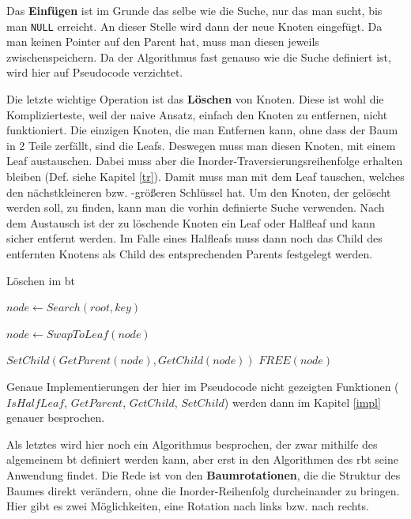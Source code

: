\documentclass[11pt]{article}
\newcommand{\lstin}[1]{\lstinline[language=C]{#1}}
\begin{document}
Das \textbf{Einfügen} ist im Grunde das selbe wie die Suche, nur das man sucht, bis man \lstin{NULL} erreicht. 
An dieser Stelle wird dann der neue Knoten eingefügt. Da man keinen Pointer auf den Parent hat, muss man diesen jeweils zwischenspeichern.
\cite[S. 205]{aic}
Da der Algorithmus fast genauso wie die Suche definiert ist, wird hier auf Pseudocode verzichtet. 

Die letzte wichtige Operation ist das \textbf{Löschen} von Knoten. Diese ist wohl die Komplizierteste, weil der naive Ansatz, einfach den Knoten zu entfernen, nicht funktioniert.
Die einzigen Knoten, die man Entfernen kann, ohne dass der Baum in 2 Teile zerfällt, sind die Leafs.
Deswegen muss man diesen Knoten, mit einem Leaf austauschen. Dabei muss aber die Inorder-Traversierungsreihenfolge erhalten bleiben (Def. siehe Kapitel \ref{tr}).
Damit muss man mit dem Leaf tauschen, welches den nächstkleineren bzw. -größeren Schlüssel hat.
Um den Knoten, der gelöscht werden soll, zu finden, kann man die vorhin definierte Suche verwenden.
Nach dem Austausch ist der zu löschende Knoten ein Leaf oder Halfleaf und kann sicher entfernt werden. 
Im Falle eines Halfleafs muss dann noch das Child des entfernten Knotens als Child des entsprechenden Parents festgelegt werden.

\begin{algorithm}
  \caption{Löschen im \gls{bt}}
  \begin{algorithmic}[1]
    \State $node \gets Search(root, key)$

      
      \Return
    \EndIf

    \State $node \gets SwapToLeaf(node)$

      \State $SetChild(GetParent(node), GetChild(node))$
    \EndIf
    \State $FREE(node)$  
    \EndProcedure
  \end{algorithmic}
\end{algorithm}
\cite[S. 210f]{aic}

Genaue Implementierungen der hier im Pseudocode nicht gezeigten Funktionen ($IsHalfLeaf$, $GetParent$, $GetChild$, $SetChild$) werden dann im Kapitel \ref{impl} genauer besprochen.

Als letztes wird hier noch ein Algorithmus besprochen, der zwar mithilfe des algemeinem \gls{bt} definiert werden kann, aber erst in den Algorithmen des \gls{rbt} seine Anwendung findet. 
Die Rede ist von den \textbf{Baumrotationen}, die die Struktur des Baumes direkt verändern, ohne die Inorder-Reihenfolg durcheinander zu bringen.
Hier gibt es zwei Möglichkeiten, eine Rotation nach links bzw. nach rechts.
\end{document}
